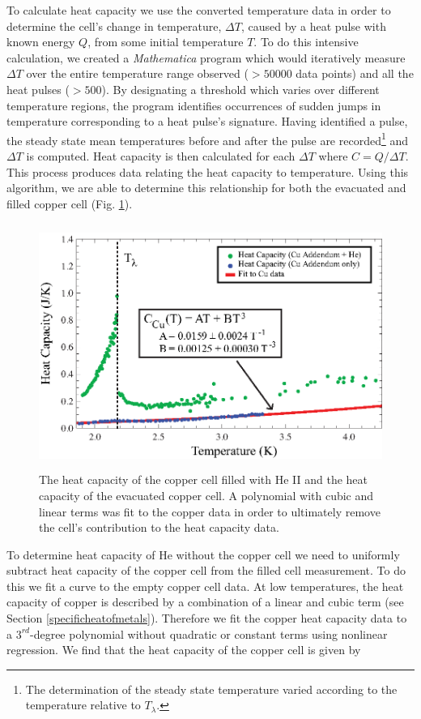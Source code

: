 To calculate heat capacity we use the converted temperature data in order to determine the cell's change in temperature, $\Delta T$, caused by a heat pulse with known energy $Q$, from some initial temperature $T$. To do this intensive calculation, we created a \emph{Mathematica} program which would iteratively measure $\Delta T$ over the entire temperature range observed ($>50000$ data points) and all the heat pulses ($>500$). By designating a threshold which varies over different temperature regions, the program identifies occurrences of sudden jumps in temperature corresponding to a heat pulse's signature. Having identified a pulse, the steady state mean temperatures before and after the pulse are recorded\footnote{The determination of the steady state temperature varied according to the temperature relative to $T_{\lambda}$.} and $\Delta T$ is computed.  Heat capacity is then calculated for each $\Delta T$ where $C=Q/\Delta T$.  This process produces data relating the heat capacity to temperature.  Using this algorithm, we are able to determine this relationship for both the evacuated and filled copper cell (Fig. \ref{fig:lambdanorm}).
\begin{figure}[htbp]
\begin{center}
\includegraphics[height=80mm]{./figures/lambdanorm.eps}
\caption{\small{The heat capacity of the copper cell filled with He II and the heat capacity of the evacuated copper cell.  A polynomial with cubic and linear terms was fit to the copper data in order to ultimately remove the cell's contribution to the heat capacity data.}}
\label{fig:lambdanorm}
\end{center}
\end{figure}

To determine heat capacity of He without the copper cell we need to uniformly subtract heat capacity of the copper cell from the filled cell measurement.  To do this we fit a curve to the empty copper cell data.  At low temperatures, the heat capacity of copper is described by a combination of a linear and cubic term (see Section \ref{specificheatofmetals}).  Therefore we fit the copper heat capacity data to a $3^{rd}$-degree polynomial without  quadratic or constant terms using nonlinear regression.  We find that the heat capacity of the copper cell is given by

